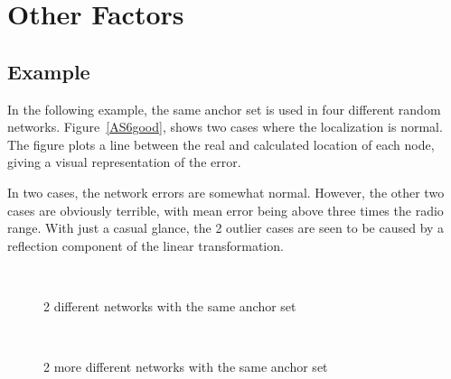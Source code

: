 \chapter{Other Factors}

\section{Example}

In the following example, the same anchor set is used in four different random networks.  Figure~\ref{AS6good}, shows two cases where the localization is normal.  
The figure plots a line between the real and calculated location of each node, giving a visual representation of the error.  

In two cases, the network errors are somewhat normal.  However, the other two cases are obviously terrible, with mean error being above three times the radio range.  With just a casual glance, the 2 outlier cases are seen to be caused by a reflection component of the linear transformation.  
\begin{figure}
  \centering
	\\
	\caption{2 different networks with the same anchor set}	
	\label{fig:AS6good}
\end{figure}
\begin{figure}
  \centering
	\\
	\caption{2 more different networks with the same anchor set}	
	\label{fig:AS6bad}
\end{figure}
